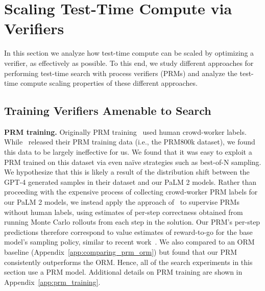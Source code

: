 \vspace{-0.2cm}
\section{Scaling Test-Time Compute via Verifiers}
\label{sec:search}
\vspace{-0.2cm}
In this section we analyze how test-time compute can be scaled by optimizing a verifier, as effectively as possible. To this end, we study different approaches for performing test-time search with process verifiers (PRMs) and analyze the test-time compute scaling properties of these different approaches.

\vspace{-0.2cm}
\subsection{Training Verifiers Amenable to Search}
\vspace{-0.1cm}

\textbf{PRM training.} Originally PRM training~\citep{uesato2022solving,lightman2023lets} used human crowd-worker labels.
While~\citet{lightman2023lets} released their PRM training data (i.e., the PRM800k dataset), we found this data to be largely ineffective for us. We found that it was easy to exploit a PRM trained on this dataset via even na\"ive strategies such as best-of-N sampling. We hypothesize that this is likely a result of the distribution shift between the GPT-4 generated samples in their dataset and our PaLM 2 models.
Rather than proceeding with the expensive process of collecting crowd-worker PRM labels for our PaLM 2 models, we instead apply the approach of~\citet{wang2023mathshepherd} to supervise PRMs without human labels, using estimates of per-step correctness obtained from running Monte Carlo rollouts from each step in the solution.
Our PRM's per-step predictions therefore correspond to value estimates of reward-to-go for the base model's sampling policy, similar to recent work~\citep{wang2023mathshepherd,setlur2024rl}. We also compared to an ORM baseline (Appendix~\ref{app:comparing_prm_orm}) but found that our PRM consistently outperforms the ORM.
Hence, all of the search experiments in this section use a PRM model. Additional details on PRM training are shown in Appendix~\ref{app:prm_training}.

